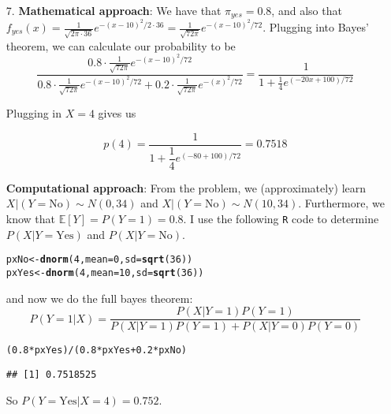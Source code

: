 \documentclass[11pt]{article}\usepackage[]{graphicx}\usepackage[]{color}
\makeatletter
\newcommand{\hlnum}[1]{\textcolor[rgb]{0.686,0.059,0.569}{#1}}%
\newcommand{\hlopt}[1]{\textcolor[rgb]{0,0,0}{#1}}%
\newcommand{\hlstd}[1]{\textcolor[rgb]{0.345,0.345,0.345}{#1}}%
\newcommand{\hlkwb}[1]{\textcolor[rgb]{0.69,0.353,0.396}{#1}}%
\newcommand{\hlkwc}[1]{\textcolor[rgb]{0.333,0.667,0.333}{#1}}%
\newcommand{\hlkwd}[1]{\textcolor[rgb]{0.737,0.353,0.396}{\textbf{#1}}}%
\newenvironment{kframe}{%
 \def\at@end@of@kframe{}%
 \ifinner\ifhmode%
  \def\at@end@of@kframe{\end{minipage}}%
  \begin{minipage}{\columnwidth}%
 \fi\fi%
 \def\FrameCommand##1{\hskip\@totalleftmargin \hskip-\fboxsep
 \colorbox{shadecolor}{##1}\hskip-\fboxsep
     \hskip-\linewidth \hskip-\@totalleftmargin \hskip\columnwidth}%
 \MakeFramed {\advance\hsize-\width
   \@totalleftmargin\z@ \linewidth\hsize
   \@setminipage}}%
 {\par\unskip\endMakeFramed%
 \at@end@of@kframe}
\newenvironment{knitrout}{}{} %
\makeatother
\begin{document}
\begin{enumerate}
\item[7.] \textbf{Mathematical approach}: We have that $\pi_{yes} = 0.8$, and also that $f_{yes}(x) = \frac{1}{\sqrt{2\pi \cdot 36}} e^{-(x-10)^2/2\cdot 36} = \frac{1}{\sqrt{72 \pi}} e^{-(x-10)^2/72}$. Plugging into Bayes' theorem, we can calculate our probability to be
\[ \dfrac{0.8\cdot  \frac{1}{\sqrt{72 \pi}} e^{-(x-10)^2/72}}    {0.8 \cdot \frac{1}{\sqrt{72 \pi}} e^{-(x-10)^2/72}+ 0.2 \cdot  \frac{1}{\sqrt{72 \pi}} e^{-(x)^2/72}} = \dfrac{1}{1 + \frac14 e^{(-20x + 100)/72}}\]

Plugging in $X = 4$ gives us 

\[p(4) = \dfrac{1}{1 + \dfrac14 e^{(-80 + 100)/72}} = 0.7518 \]

\textbf{Computational approach}: From the problem, we (approximately) learn $X|(Y = \text{No}) \sim N(0, 34)$ and $X|(Y = \text{No}) \sim N(10, 34)$. Furthermore, we know that $\mathbb{E}[Y] = P(Y = 1) = 0.8$. I use the following \texttt{R} code to determine $P(X| Y = \text{Yes})$ and $P(X | Y = \text{No})$.

\begin{knitrout}
\color{fgcolor}\begin{kframe}
\begin{alltt}
\hlstd{pxNo} \hlkwb{<-} \hlkwd{dnorm}\hlstd{(}\hlnum{4}\hlstd{,} \hlkwc{mean} \hlstd{=} \hlnum{0}\hlstd{,} \hlkwc{sd} \hlstd{=} \hlkwd{sqrt}\hlstd{(}\hlnum{36}\hlstd{))}
\hlstd{pxYes} \hlkwb{<-} \hlkwd{dnorm}\hlstd{(}\hlnum{4}\hlstd{,} \hlkwc{mean} \hlstd{=} \hlnum{10}\hlstd{,} \hlkwc{sd} \hlstd{=} \hlkwd{sqrt}\hlstd{(}\hlnum{36}\hlstd{))}
\end{alltt}
\end{kframe}
\end{knitrout}

and now we do the full bayes theorem: $$ P(Y = 1 | X) = \frac{P(X|Y = 1) P(Y = 1)}{ P(X|Y=1)P(Y = 1) + P(X | Y = 0)P(Y = 0)}$$


\begin{knitrout}
\color{fgcolor}\begin{kframe}
\begin{alltt}
\hlstd{(}\hlnum{0.8} \hlopt{*} \hlstd{pxYes)}\hlopt{/}\hlstd{(}\hlnum{0.8} \hlopt{*} \hlstd{pxYes} \hlopt{+} \hlnum{0.2} \hlopt{*} \hlstd{pxNo)}
\end{alltt}
\begin{verbatim}
## [1] 0.7518525
\end{verbatim}
\end{kframe}
\end{knitrout}

So $P(Y = \text{Yes} | X = 4) = 0.752$. 


\end{enumerate}
\end{document}
